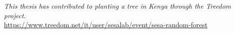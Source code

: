 \begin{titlepage}
\nonumber
\null {}
\begin{flushright}
{\textit{This thesis has contributed to planting a tree in Kenya through the Treedom project.}}
\\
\vspace{0.5cm}
{\footnotesize\url{https://www.treedom.net/it/user/sesalab/event/sesa-random-forest}}
\end{flushright}
\end{titlepage}
